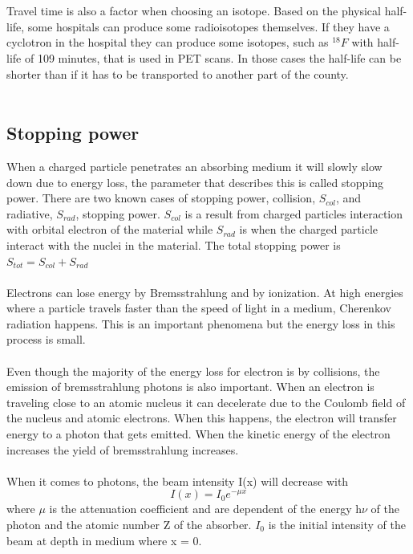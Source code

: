 \documentclass[twoside,english]{uiofysmaster/uiofysmaster}
\begin{document}
\\
\\
Travel time is also a factor when choosing an isotope. Based on the physical half-life, some hospitals can produce some radioisotopes themselves. If they have a cyclotron in the hospital they can produce some isotopes, such as $^{18}F$ with half-life of 109 minutes, that is used in PET scans. In those cases the half-life can be shorter than if it has to be transported to another part of the county. \\
\\

\subsection{Stopping power}
When a charged particle penetrates an absorbing medium it will slowly slow down due to energy loss, the parameter that describes this is called stopping power. There are two known cases of stopping power\cite{Nuclear_medicine}, collision, $S_{col}$, and radiative, $S_{rad}$, stopping power. $S_{col}$ is a result from charged particles interaction with orbital electron of the material while $S_{rad}$ is when the charged particle interact with the nuclei in the material. The total stopping power is $S_{tot} = S_{col} + S_{rad}$ \\
\\
Electrons can lose energy by Bremsstrahlung and by ionization. At high energies where a particle travels faster than the speed of light in a medium, Cherenkov radiation happens. This is an important phenomena but the energy loss in this process is small\cite{nuclearchem}.\\
\\
Even though the majority of the energy loss for electron is by collisions, the emission of bremsstrahlung photons is also important. When an electron is traveling close to an atomic nucleus it can decelerate due to the Coulomb field of the nucleus and atomic electrons. When this happens, the electron will transfer energy to a photon that gets emitted. When the kinetic energy of the electron increases the yield of bremsstrahlung increases.
\\
\\
When it comes to photons, the beam intensity I(x) will decrease with \begin{equation}
    I(x) = I_0e^{-\mu x}
\end{equation}
\noindent
where $\mu$ is the attenuation coefficient and are dependent of the energy h$\nu$ of the photon and the atomic number Z of the absorber\cite{Nuclear_medicine}. $I_0$ is the initial intensity of the beam at depth in medium where x = 0.\\
\end{document}
